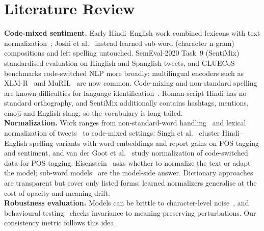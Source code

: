 \documentclass[10pt,twocolumn,letterpaper]{article}
\begin{document}
\section{Literature Review}
\label{sec:lit}
\textbf{Code-mixed sentiment.} Early Hindi--English work combined lexicons with text normalization~\cite{sharma2015text}; Joshi et al.~\cite{joshi2016subword} instead learned sub-word (character n-gram) compositions and left spelling untouched. SemEval-2020 Task~9 (SentiMix)~\cite{patwa2020semeval} standardised evaluation on Hinglish and Spanglish tweets, and GLUECoS~\cite{khanuja2020gluecos} benchmarks code-switched NLP more broadly; multilingual encoders such as XLM-R~\cite{conneau2020unsupervised} and MuRIL~\cite{khanuja2021muril} are now common. Code-mixing and non-standard spelling are known difficulties for language identification~\cite{barman2014code}. Roman-script Hindi has no standard orthography, and SentiMix additionally contains hashtags, mentions, emoji and English slang, so the vocabulary is long-tailed.\\
\textbf{Normalization.} Work ranges from non-standard-word handling~\cite{sproat2001normalization} and lexical normalization of tweets~\cite{han2011lexical,baldwin2015shared} to code-mixed settings: Singh et al.~\cite{singh2018automatic} cluster Hindi--English spelling variants with word embeddings and report gains on POS tagging and sentiment, and van der Goot et al.~\cite{vandergoot2021lexical} study normalization of code-switched data for POS tagging. Eisenstein~\cite{eisenstein2013bad} asks whether to normalize the text or adapt the model; sub-word models~\cite{bojanowski2017enriching} are the model-side answer. Dictionary approaches are transparent but cover only listed forms; learned normalizers generalise at the cost of opacity and meaning drift.\\
\textbf{Robustness evaluation.} Models can be brittle to character-level noise~\cite{belinkov2018synthetic}, and behavioural testing~\cite{ribeiro2020checklist} checks invariance to meaning-preserving perturbations. Our consistency metric follows this idea.
\end{document}
